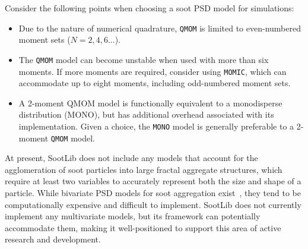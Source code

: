 \documentclass[preprint,letterpaper]{elsarticle}
\begin{document}
Consider the following points when choosing a soot PSD model for simulations:
\begin{itemize}
    \item Due to the nature of numerical quadrature, \texttt{QMOM} is limited to even-numbered moment sets ($N=2,4,6\ldots$).
    \item The \texttt{QMOM} model can become unstable when used with more than six moments. If more moments are required, consider using \texttt{MOMIC}, which can accommodate up to eight moments, including odd-numbered moment sets.
    \item A 2-moment QMOM model is functionally equivalent to a monodisperse distribution (MONO), but has additional overhead associated with its implementation. Given a choice, the \texttt{MONO} model is generally preferable to a 2-moment \texttt{QMOM} model.
\end{itemize}

At present, SootLib does not include any models that account for the agglomeration of soot particles into large fractal aggregate structures, which require at least two variables to accurately represent both the size and shape of a particle. While bivariate PSD models for soot aggregation exist~\cite{Wright_2001,Mueller_2009,Blanquart_2009c}, they tend to be computationally expensive and difficult to implement. SootLib does not currently implement any multivariate models, but its framework can potentially accommodate them, making it well-positioned to support this area of active research and development.

\end{document}
